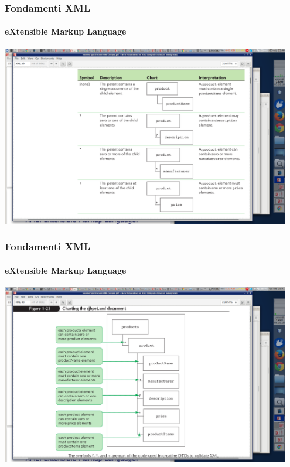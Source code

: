 

\begin{frame}
	\frametitle{Fondamenti XML}
	\framesubtitle{eXtensible Markup Language}
	\addtocounter{nframe}{1}

	\begin{center}

		\includegraphics[width=0.95\textwidth]{imgs/xml-parent-child-quantifier.png}
	\end{center}

\end{frame}

\begin{frame}
	\frametitle{Fondamenti XML}
	\framesubtitle{eXtensible Markup Language}
	\addtocounter{nframe}{1}

	\begin{center}
		\includegraphics[width=0.95\textwidth]{imgs/xml-parent-child-quantifier2.png}
	\end{center}

\end{frame}


